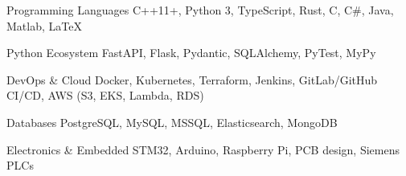 

\begin{cvskills}

\cvskill
    {Programming Languages}
    {C++11+, Python 3, TypeScript, Rust, C, C\#, Java, Matlab, \LaTeX}

\cvskill
    {Python Ecosystem}
    {FastAPI, Flask, Pydantic, SQLAlchemy, PyTest, MyPy}

\cvskill
    {DevOps \& Cloud}
    {Docker, Kubernetes, Terraform, Jenkins, GitLab/GitHub CI/CD, AWS (S3, EKS, Lambda, RDS)}

\cvskill
    {Databases}
    {PostgreSQL, MySQL, MSSQL, Elasticsearch, MongoDB}




\cvskill
    {Electronics \& Embedded}
    {STM32, Arduino, Raspberry Pi, PCB design, Siemens PLCs}

\end{cvskills}
